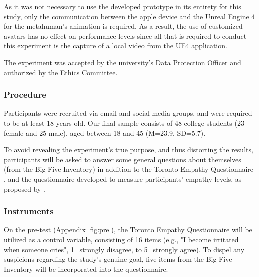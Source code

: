 As it was not necessary to use the developed prototype in its entirety for this study, only the communication between the apple device and the Unreal Engine 4 for the metahuman's animation is required. As a result, the use of customized avatars has no effect on performance levels since all that is required to conduct this experiment is the capture of a local video from the UE4 application.

The experiment was accepted by the university's Data Protection Officer and authorized by the Ethics Committee.

\subsubsection{Procedure}


Participants were recruited via email and social media groups, and were required to be at least 18 years old. Our final sample consists of 48 college students (23 female and 25 male), aged between 18 and 45 (M=23.9, SD=5.7). 



To avoid revealing the experiment's true purpose, and thus distorting the results, participants will be asked to answer some general questions about themselves (from the Big Five Inventory) in addition to the Toronto Empathy Questionnaire \cite{SPR03}, and the questionnaire developed to measure participants' empathy levels, as proposed by \cite{ROT19, ZIB19}. 


\subsubsection{Instruments}
On the pre-test (Appendix \ref{fig:pre}), the Toronto Empathy Questionnaire \cite{SPR03} will be utilized as a control variable, consisting of 16 items (e.g., "I become irritated when someone cries", 1=strongly disagree, to 5=strongly agree). To dispel any suspicions regarding the study's genuine goal, five items from the Big Five Inventory \cite{JOH91} will be incorporated into the questionnaire.

